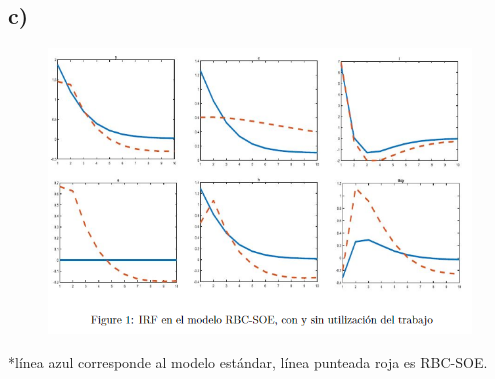 \documentclass{article}
\begin{document}
\newpage
	\subsection{c)}
			\begin{figure}[h!]
		\centering
		\includegraphics[width=0.7\linewidth]{captura 1}
		\end{figure}
*línea azul corresponde al modelo estándar, línea punteada roja es RBC-SOE.
\end{document}
